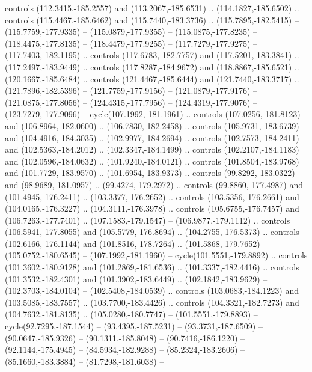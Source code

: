 \begin{scope}[cm={{1.25,0.0,0.0,-1.25,(0.0,442.91375)}}]
\begin{scope}[xscale=1.000,yscale=-1.000,fill=c545457,line join=miter,line cap=butt,line width=0.800pt]
      controls (112.3415,-185.2557) and (113.2067,-185.6531) .. (114.1827,-185.6502)
      .. controls (115.4467,-185.6462) and (115.7440,-183.3736) ..
      (115.7895,-182.5415) -- (115.7759,-177.9335) -- (115.0879,-177.9355) --
      (115.0875,-177.8235) -- (118.4475,-177.8135) -- (118.4479,-177.9255) --
      (117.7279,-177.9275) -- (117.7403,-182.1195) .. controls (117.6783,-182.7757)
      and (117.5201,-183.3841) .. (117.2497,-183.9449) .. controls
      (117.8287,-184.9672) and (118.8867,-185.6521) .. (120.1667,-185.6484) ..
      controls (121.4467,-185.6444) and (121.7440,-183.3717) .. (121.7896,-182.5396)
      -- (121.7759,-177.9156) -- (121.0879,-177.9176) -- (121.0875,-177.8056) --
      (124.4315,-177.7956) -- (124.4319,-177.9076) -- (123.7279,-177.9096) --
      cycle(107.1992,-181.1961) .. controls (107.0256,-181.8123) and
      (106.8964,-182.0600) .. (106.7830,-182.2458) .. controls (105.9731,-183.6739)
      and (104.4916,-184.3035) .. (102.9977,-184.2694) .. controls
      (102.7573,-184.2411) and (102.5363,-184.2012) .. (102.3347,-184.1499) ..
      controls (102.2107,-184.1183) and (102.0596,-184.0632) .. (101.9240,-184.0121)
      .. controls (101.8504,-183.9768) and (101.7729,-183.9570) ..
      (101.6954,-183.9373) .. controls (99.8292,-183.0322) and (98.9689,-181.0957)
      .. (99.4274,-179.2972) .. controls (99.8860,-177.4987) and
      (101.4945,-176.2411) .. (103.3377,-176.2652) .. controls (103.5356,-176.2661)
      and (104.0165,-176.3227) .. (104.3111,-176.3978) .. controls
      (105.6755,-176.7457) and (106.7263,-177.7401) .. (107.1583,-179.1547) --
      (106.9877,-179.1112) .. controls (106.5941,-177.8055) and (105.5779,-176.8694)
      .. (104.2755,-176.5373) .. controls (102.6166,-176.1144) and
      (101.8516,-178.7264) .. (101.5868,-179.7652) -- (105.0752,-180.6545) --
      (107.1992,-181.1960) -- cycle(101.5551,-179.8892) .. controls
      (101.3602,-180.9128) and (101.2869,-181.6536) .. (101.3337,-182.4416) ..
      controls (101.3532,-182.4301) and (101.3902,-183.6449) .. (102.1842,-183.9629)
      -- (102.3703,-184.0104) -- (102.5408,-184.0539) .. controls
      (103.0683,-184.1223) and (103.5085,-183.7557) .. (103.7700,-183.4426) ..
      controls (104.3321,-182.7273) and (104.7632,-181.8135) .. (105.0280,-180.7747)
      -- (101.5551,-179.8893) -- cycle(92.7295,-187.1544) -- (93.4395,-187.5231) --
      (93.3731,-187.6509) -- (90.0647,-185.9326) -- (90.1311,-185.8048) --
      (90.7416,-186.1220) -- (92.1144,-175.4945) -- (84.5934,-182.9288) --
      (85.2324,-183.2606) -- (85.1660,-183.3884) -- (81.7298,-181.6038) --

\end{scope}
\end{scope}

